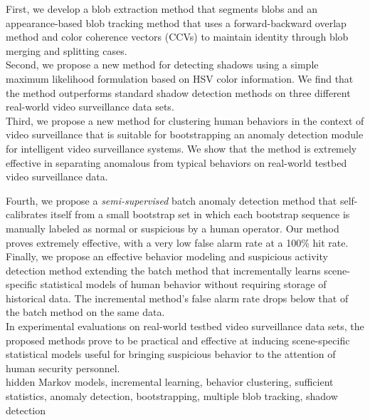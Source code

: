 \documentclass{article}
\begin{document}
\noindent First, we develop a blob extraction method that segments blobs and an
appearance-based blob tracking method that uses a forward-backward
overlap method and color coherence vectors (CCVs) to maintain identity
through blob merging and splitting cases.\\

\noindent Second, we propose a new method for detecting shadows using a simple
maximum likelihood formulation based on HSV color information. We find
that the method outperforms standard shadow detection methods on three
different real-world video surveillance data sets.\\

\noindent Third, we propose a new method for clustering human behaviors in the
context of video surveillance that is suitable for bootstrapping an
anomaly detection module for intelligent video surveillance
systems. We show that the method is extremely effective in separating
anomalous from typical behaviors on real-world testbed video
surveillance data.\\

\newpage

\noindent Fourth, we propose a \textit{semi-supervised} batch anomaly
detection method that self-calibrates itself from a small bootstrap
set in which each bootstrap sequence is manually labeled as normal or
suspicious by a human operator. Our method proves extremely effective,
with a very low false alarm rate at a 100\% hit rate.\\

\noindent Finally, we propose an effective behavior modeling and suspicious
activity detection method extending the batch method that
incrementally learns scene-specific statistical models of human
behavior without requiring storage of historical data. The incremental
method's false alarm rate drops below that of the batch method on the
same data.\\

\noindent In experimental evaluations on real-world testbed video surveillance
data sets, the proposed methods prove to be practical and effective at
inducing scene-specific statistical models useful for bringing
suspicious behavior to the attention of human security personnel.\\

 hidden Markov models, incremental learning, 
behavior clustering, sufficient statistics, anomaly detection, bootstrapping,  
multiple blob tracking, shadow detection
\end{document}
